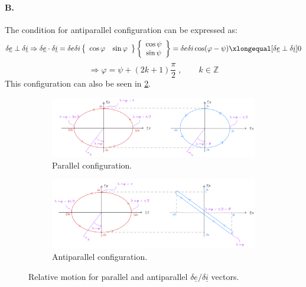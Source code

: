 			\paragraph{\textcolor{GMVred}{B.} \\}
			\indent The condition for antiparallel configuration can be expressed as:
			\[
			\delta\underline{e} \perp \delta \underline{i} \Rightarrow \delta \underline{e} \cdot \delta\underline{i} = \delta e \delta i \left\{ \begin{array}{cc}
			\cos\varphi & \sin\varphi
			\end{array}\right\}
			\left\{ \begin{array}{c}
			\cos\psi\\
			\sin\psi
			\end{array}\right\} =  \delta e \delta i \cos (\varphi - \psi) \xlongequal[\delta\underline{e} \perp \delta \underline{i}]{} 0
			\]
			\begin{equation}
			\label{eqCh2:Antiparallel_ei}\Longrightarrow \varphi = \psi + (2k+1)\frac{\pi}{2}\; , \qquad k \in \mathbb{Z}
			\end{equation}
			\indent This configuration can also be seen in \ref{figCh2:Antiparallel}.
			\begin{figure}[ht]
			\centering
			\medskip
			\begin{subfigure}[t]{.9\linewidth}
			\begin{changemargin}{-1.3cm}{-1cm}
			\centering\includegraphics[width=\linewidth]{Chapters/Chapter_02/E_I_parallel}
			\end{changemargin}
			\caption{Parallel configuration.}
			\label{figCh2:Parallel}
			\end{subfigure}
			\begin{subfigure}[t]{.9\linewidth}
			\begin{changemargin}{-1.3cm}{-1cm}
			\centering\includegraphics[width=\linewidth]{Chapters/Chapter_02/E_I_antiparallel}
			\end{changemargin}
			\caption{Antiparallel configuration.}
			\label{figCh2:Antiparallel}
			\end{subfigure}
			\caption{Relative motion for parallel and antiparallel $\delta \underline{e}/\delta\underline{i}$ vectors.}
			\label{fig:E_I_par_anti}
			\end{figure}
